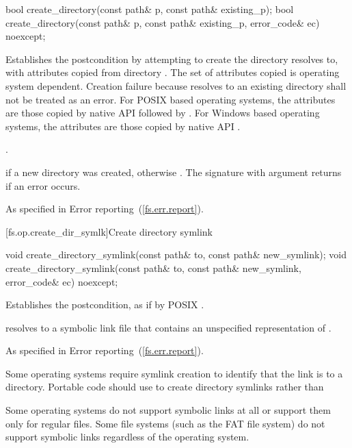 \begin{itemdecl}
bool create_directory(const path& p, const path& existing_p);
bool create_directory(const path& p, const path& existing_p, error_code& ec) noexcept;
\end{itemdecl}

\begin{itemdescr}
\pnum
\effects Establishes the postcondition by attempting to create the
  directory  resolves to, with
  attributes copied from directory . The set of attributes
  copied is operating system dependent. Creation failure because  resolves to an existing directory shall not be
  treated as an error.
\enternote For POSIX based operating systems, the
      attributes are those copied by native API 
      followed by . For
      Windows based operating systems, the attributes are those copied by native
      API .
\exitnote

\pnum
\postcondition {}.

\pnum
\returns {} if a new directory was created, otherwise .
  The signature with argument  returns  if an error occurs.

\pnum
\throws As specified in Error reporting~(\ref{fs.err.report}).
\end{itemdescr}


[fs.op.create_dir_symlk]{Create directory symlink}

\begin{itemdecl}
void create_directory_symlink(const path& to, const path& new_symlink);
void create_directory_symlink(const path& to, const path& new_symlink,
                              error_code& ec) noexcept;
\end{itemdecl}

\begin{itemdescr}
\pnum
\effects Establishes the postcondition, as if by POSIX .

\pnum
\postcondition {} resolves to a symbolic link file that
  contains an unspecified representation of .

\pnum
\throws As specified in Error reporting~(\ref{fs.err.report}).

\pnum
\enternote Some operating systems require symlink creation to
  identify that the link is to a directory. Portable code should use  to create directory symlinks rather than  \exitnote

\pnum
\enternote Some operating systems do not support symbolic links at all or support
  them only for regular files.
  Some file systems (such as the FAT file system) do not
  support
  symbolic links regardless of the operating system. \exitnote
\end{itemdescr}

